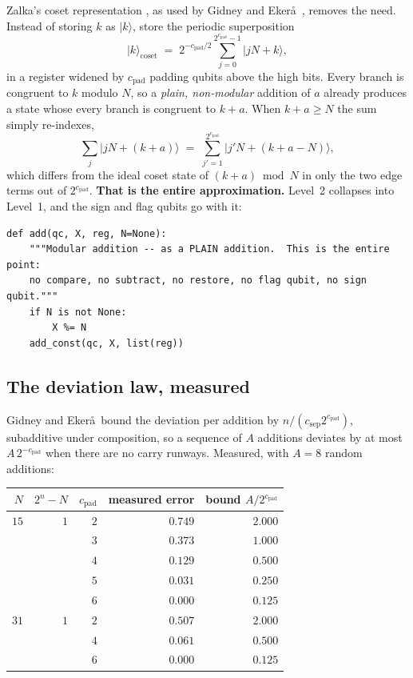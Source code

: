 \documentclass[11pt]{article}
\renewcommand{\ket}[1]{\lvert #1 \rangle}
\theoremstyle{plain}
\theoremstyle{remark}
\begin{document}
Zalka's coset representation \cite{zalka-coset}, as used by Gidney and Eker\aa\ \cite{gidney-ekera},
removes the need. Instead of storing $k$ as $\ket k$, store the periodic superposition
\[
\ket{k}_{\mathrm{coset}} \;=\; 2^{-c_{\mathrm{pad}}/2}\sum_{j=0}^{2^{c_{\mathrm{pad}}}-1}\ket{jN+k},
\]
in a register widened by $c_{\mathrm{pad}}$ padding qubits above the high bits. Every branch is
congruent to $k$ modulo $N$, so a \emph{plain, non-modular} addition of $a$ already produces a state
whose every branch is congruent to $k+a$. When $k+a\ge N$ the sum simply re-indexes,
\[
\sum_j\ket{jN+(k{+}a)}\;=\;\sum_{j'=1}^{2^{c_{\mathrm{pad}}}}\ket{j'N+(k{+}a{-}N)},
\]
which differs from the ideal coset state of $(k{+}a)\bmod N$ in only the two edge terms out of
$2^{c_{\mathrm{pad}}}$. \textbf{That is the entire approximation.} Level~2 collapses into Level~1,
and the sign and flag qubits go with it:

\begin{lstlisting}
def add(qc, X, reg, N=None):
    """Modular addition -- as a PLAIN addition.  This is the entire point:
    no compare, no subtract, no restore, no flag qubit, no sign qubit."""
    if N is not None:
        X %= N
    add_const(qc, X, list(reg))
\end{lstlisting}

\subsection{The deviation law, measured}

Gidney and Eker\aa\ bound the deviation per addition by $n/(c_{\mathrm{sep}}2^{c_{\mathrm{pad}}})$,
subadditive under composition, so a sequence of $A$ additions deviates by at most
$A\,2^{-c_{\mathrm{pad}}}$ when there are no carry runways. Measured, with $A=8$ random additions:

\begin{center}\small
\begin{tabular}{@{}rrrrr@{}}
\toprule
$N$ & $2^n-N$ & $c_{\mathrm{pad}}$ & measured error & bound $A/2^{c_{\mathrm{pad}}}$\\
\midrule
$15$ & $1$ & $2$ & $0.749$ & $2.000$\\
     &     & $3$ & $0.373$ & $1.000$\\
     &     & $4$ & $0.129$ & $0.500$\\
     &     & $5$ & $0.031$ & $0.250$\\
     &     & $6$ & $0.000$ & $0.125$\\
\midrule
$31$ & $1$ & $2$ & $0.507$ & $2.000$\\
     &     & $4$ & $0.061$ & $0.500$\\
     &     & $6$ & $0.000$ & $0.125$\\
\bottomrule
\end{tabular}
\end{center}
\end{document}
